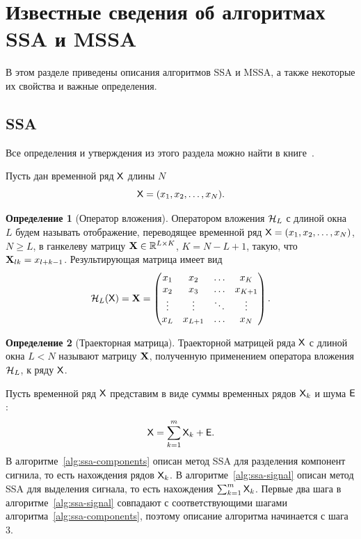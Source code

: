 \documentclass[specialist,
  substylefile=spbu.rtx,
subf,href,colorlinks=true, 12pt]{disser}
\theoremstyle{plain}
\theoremstyle{definition}
\newtheorem{definition}{Определение}[section]
\theoremstyle{remark}
\begin{document}
\section{Известные сведения об алгоритмах SSA и MSSA}\label{sec:known-results-ssa}
В этом разделе приведены описания алгоритмов SSA и MSSA, а также некоторые их свойства и важные определения.

\subsection{SSA}\label{subsec:ssa}
Все определения и утверждения из этого раздела можно найти в книге~\cite{ssa}.

Пусть дан временной ряд $\mathsf{X}$ длины $N$
\[
  \mathsf{X}=(x_1,x_2,\ldots,x_N).
\]

\begin{definition}[Оператор вложения]
  \label{def:injection-op}
  Оператором вложения $\mathcal{H}_L$ с длиной окна $L$ будем называть отображение, переводящее временной ряд
  $\mathsf{X}=(x_1, x_2,\ldots, x_N)$, $N \geqslant L$, в ганкелеву матрицу $\mathbf{X}\in \mathbb{R}^{L \times K}$, $K = N-L+1$,
  такую, что $\mathbf{X}_{lk}=x_{l+k-1}$.
  Результирующая матрица имеет вид
  \[
    \mathcal{H}_L(\mathsf{X}) = \mathbf{X} =
    \begin{pmatrix}
      x_1    & x_2     & \ldots & x_K     \\
      x_2    & x_3     & \ldots & x_{K+1} \\
      \vdots & \vdots  & \ddots & \vdots  \\
      x_L    & x_{L+1} & \ldots & x_N
    \end{pmatrix}.
  \]
\end{definition}

\begin{definition}[Траекторная матрица]
  Траекторной матрицей ряда $\mathsf{X}$ с длиной окна $L<N$ называют матрицу $\mathbf{X}$, полученную применением оператора
  вложения $\mathcal{H}_L$, к ряду $\mathsf{X}$.
\end{definition}

Пусть временной ряд $\mathsf{X}$ представим в виде суммы временных рядов $\mathsf{X}_k$ и шума $\mathsf{E}$:
\[
  \mathsf{X} = \sum_{k=1}^{m} \mathsf{X}_k + \mathsf{E}.
\]
В алгоритме~\ref{alg:ssa-components} описан метод SSA для разделения компонент сигнила, то есть
нахождения рядов $\mathsf{X}_k$.
В алгоритме~\ref{alg:ssa-signal} описан метод SSA для выделения сигнала, то есть нахождения $\sum_{k=1}^{m} \mathsf{X}_k$.
Первые два шага в алгоритме~\ref{alg:ssa-signal} совпадают с соответствующими шагами
алгоритма~\ref{alg:ssa-components}, поэтому описание алгоритма начинается с шага 3.
\end{document}
